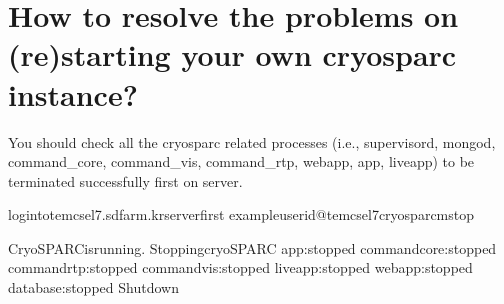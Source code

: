\documentclass[a4paper,10pt,english]{sphinxmanual}
\begin{document}
\section{How to resolve the problems on (re)starting your own cryosparc instance?}
\label{\detokenize{faq:how-to-resolve-the-problems-on-re-starting-your-own-cryosparc-instance}}\label{\detokenize{faq:id1}}
\sphinxAtStartPar
You should check all the cryosparc related processes (i.e., supervisord, mongod, command\_core, command\_vis, command\_rtp, webapp, app, liveapp) to be terminated successfully first on  server.

\begin{sphinxVerbatim}[commandchars=\\\{\}]
logintotem\PYGZhy{}cs\PYGZhy{}el7.sdfarm.krserverfirst
exampleuserid@tem\PYGZhy{}cs\PYGZhy{}el7\PYGZdl{}\PYGZgt{}cryosparcmstop

CryoSPARCisrunning.
StoppingcryoSPARC
app:stopped
command\PYGZus{}core:stopped
command\PYGZus{}rtp:stopped
command\PYGZus{}vis:stopped
liveapp:stopped
webapp:stopped
database:stopped
Shutdown


\end{sphinxVerbatim}
\end{document}
